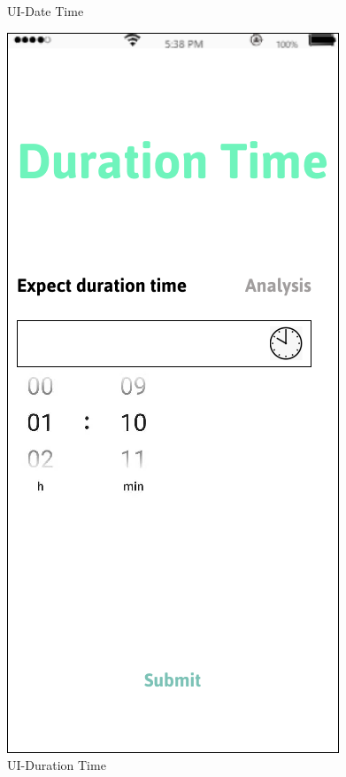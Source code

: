 \documentclass[a4paper,12pt]{report}
\begin{document}
\begin{figure}[H]
\begin{minipage}[t]{0.56\linewidth}
		\caption{UI-Date Time}
		\label{fig:UI-DateTime}
	\end{minipage}%
	\begin{minipage}[t]{0.56\linewidth}
		\centering
		\includegraphics[scale=0.5]{UI-DurationTime}
		\caption{UI-Duration Time}
		\label{fig:UI-DurationTime}
	\end{minipage}
\end{figure}
\end{document}
